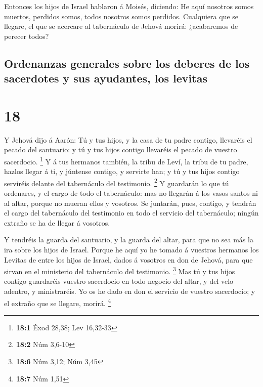  Entonces los hijos de Israel hablaron á Moisés,
diciendo: He aquí nosotros somos muertos, perdidos somos, todos nosotros
somos perdidos.  Cualquiera que se llegare, el que se
acercare al tabernáculo de Jehová morirá: ¿acabaremos de perecer todos?

\hypertarget{ordenanzas-generales-sobre-los-deberes-de-los-sacerdotes-y-sus-ayudantes-los-levitas}{%
\subsection{Ordenanzas generales sobre los deberes de los sacerdotes y
sus ayudantes, los
levitas}\label{ordenanzas-generales-sobre-los-deberes-de-los-sacerdotes-y-sus-ayudantes-los-levitas}}

\hypertarget{section-17}{%
\section{18}\label{section-17}}

 Y Jehová dijo á Aarón: Tú y tus hijos, y la casa de tu
padre contigo, llevaréis el pecado del santuario: y tú y tus hijos
contigo llevaréis el pecado de vuestro sacerdocio. \footnote{\textbf{18:1}
  Éxod 28,38; Lev 16,32-33}  Y á tus hermanos también, la
tribu de Leví, la tribu de tu padre, hazlos llegar á ti, y júntense
contigo, y servirte han; y tú y tus hijos contigo serviréis delante del
tabernáculo del testimonio. \footnote{\textbf{18:2} Núm 3,6-10}
 Y guardarán lo que tú ordenares, y el cargo de todo el
tabernáculo: mas no llegarán á los vasos santos ni al altar, porque no
mueran ellos y vosotros.  Se juntarán, pues, contigo, y
tendrán el cargo del tabernáculo del testimonio en todo el servicio del
tabernáculo; ningún extraño se ha de llegar á vosotros.

 Y tendréis la guarda del santuario, y la guarda del
altar, para que no sea más la ira sobre los hijos de Israel.
 Porque he aquí yo he tomado á vuestros hermanos los
Levitas de entre los hijos de Israel, dados á vosotros en don de Jehová,
para que sirvan en el ministerio del tabernáculo del testimonio.
\footnote{\textbf{18:6} Núm 3,12; Núm 3,45}  Mas tú y tus
hijos contigo guardaréis vuestro sacerdocio en todo negocio del altar, y
del velo adentro, y ministraréis. Yo os he dado en don el servicio de
vuestro sacerdocio; y el extraño que se llegare, morirá. \footnote{\textbf{18:7}
  Núm 1,51}

